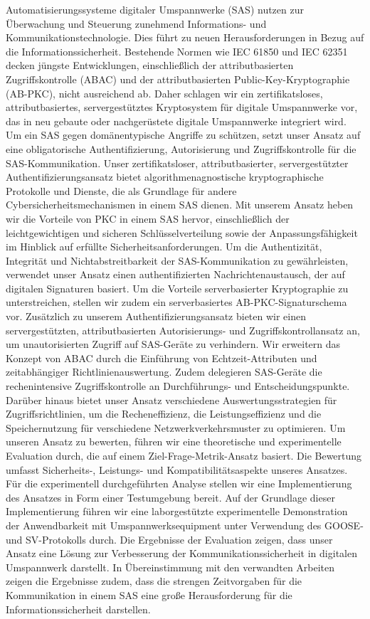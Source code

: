 \Abstract
Automatisierungssysteme digitaler Umspannwerke (SAS) nutzen zur Überwachung und Steuerung zunehmend Informations- und Kommunikationstechnologie.
Dies führt zu neuen Herausforderungen in Bezug auf die Informationssicherheit.
Bestehende Normen wie IEC 61850 und IEC 62351 decken jüngste Entwicklungen, einschließlich der attributbasierten Zugriffskontrolle (ABAC) und der attributbasierten Public-Key-Kryptographie (AB-PKC), nicht ausreichend ab.
Daher schlagen wir ein zertifikatsloses, attributbasiertes, servergestütztes Kryptosystem für digitale Umspannwerke vor, das in neu gebaute oder nachgerüstete digitale Umspannwerke integriert wird.
Um ein SAS gegen domänentypische Angriffe zu schützen, setzt unser Ansatz auf eine obligatorische Authentifizierung, Autorisierung und Zugriffskontrolle für die SAS-Kommunikation.
Unser zertifikatsloser, attributbasierter, servergestützter Authentifizierungsansatz bietet algorithmenagnostische kryptographische Protokolle und Dienste, die als Grundlage für andere Cybersicherheitsmechanismen in einem SAS dienen.
Mit unserem Ansatz heben wir die Vorteile von PKC in einem SAS hervor, einschließlich der leichtgewichtigen und sicheren Schlüsselverteilung sowie der Anpassungsfähigkeit im Hinblick auf erfüllte Sicherheitsanforderungen.
Um die Authentizität, Integrität und Nichtabstreitbarkeit der SAS-Kommunikation zu gewährleisten, verwendet unser Ansatz einen authentifizierten Nachrichtenaustausch, der auf digitalen Signaturen basiert.
Um die Vorteile serverbasierter Kryptographie zu unterstreichen, stellen wir zudem ein serverbasiertes AB-PKC-Signaturschema vor.
Zusätzlich zu unserem Authentifizierungsansatz bieten wir einen servergestützten, attributbasierten Autorisierungs- und Zugriffskontrollansatz an, um unautorisierten Zugriff auf SAS-Geräte zu verhindern.
Wir erweitern das Konzept von ABAC durch die Einführung von Echtzeit-Attributen und zeitabhängiger Richtlinienauswertung.
Zudem delegieren SAS-Geräte die rechenintensive Zugriffskontrolle an Durchführungs- und Entscheidungspunkte.
Darüber hinaus bietet unser Ansatz verschiedene Auswertungsstrategien für Zugriffsrichtlinien, um die Recheneffizienz, die Leistungseffizienz und die Speichernutzung für verschiedene Netzwerkverkehrsmuster zu optimieren.
Um unseren Ansatz zu bewerten, führen wir eine theoretische und experimentelle Evaluation durch, die auf einem Ziel-Frage-Metrik-Ansatz basiert.
Die Bewertung umfasst Sicherheits-, Leistungs- und Kompatibilitätsaspekte unseres Ansatzes.
Für die experimentell durchgeführten Analyse stellen wir eine Implementierung des Ansatzes in Form einer Testumgebung bereit.
Auf der Grundlage dieser Implementierung führen wir eine laborgestützte experimentelle Demonstration der Anwendbarkeit mit Umspannwerksequipment unter Verwendung des GOOSE- und SV-Protokolls durch.
Die Ergebnisse der Evaluation zeigen, dass unser Ansatz eine Lösung zur Verbesserung der Kommunikationssicherheit in digitalen Umspannwerk darstellt.
In Übereinstimmung mit den verwandten Arbeiten zeigen die Ergebnisse zudem, dass die strengen Zeitvorgaben für die Kommunikation in einem SAS eine große Herausforderung für die Informationssicherheit darstellen.
